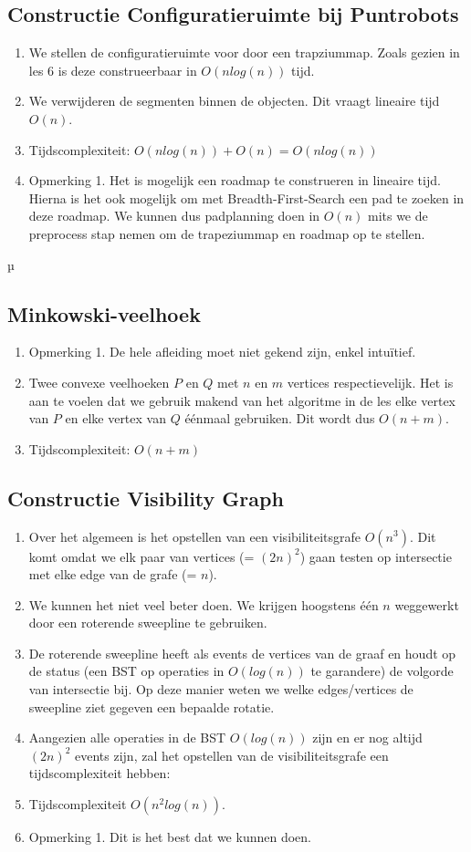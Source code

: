 \documentclass[12pt,a4paper]{article}
\begin{document}
		\subsection{Constructie Configuratieruimte bij Puntrobots}
			\begin{enumerate}
				\item We stellen de configuratieruimte voor door een trapziummap. Zoals gezien in les 6 is deze construeerbaar in $O(n log (n))$ tijd. 
				\item We verwijderen de segmenten binnen de objecten. Dit vraagt lineaire tijd $O(n)$.
				\item Tijdscomplexiteit: $O(n log (n)) + O(n) = O(n log (n))$
				\item Opmerking 1. Het is mogelijk een roadmap te construeren in lineaire tijd. Hierna is het ook mogelijk om met Breadth-First-Search een pad te zoeken in deze roadmap. We kunnen dus padplanning doen in $O(n)$ mits we de preprocess stap nemen om de trapeziummap en roadmap op te stellen.
			\end{enumerate}µ
		\subsection{Minkowski-veelhoek}
			\begin{enumerate}
				\item Opmerking 1. De hele afleiding moet niet gekend zijn, enkel intuïtief.
				\item Twee convexe veelhoeken $P$ en $Q$ met $n$ en $m$ vertices respectievelijk. Het is aan te voelen dat we gebruik makend van het algoritme in de les elke vertex van $P$ en elke vertex van $Q$ éénmaal gebruiken. Dit wordt dus $O(n + m)$.
				\item Tijdscomplexiteit: $O(n + m)$
			\end{enumerate}
		\subsection{Constructie Visibility Graph} 
			\begin{enumerate}
				\item Over het algemeen is het opstellen van een visibiliteitsgrafe $O(n^3)$. Dit komt omdat we elk paar van vertices (= $(2n)^2$) gaan testen op intersectie met elke edge van de grafe (= $n$). 
				\item We kunnen het niet veel beter doen. We krijgen hoogstens één $n$ weggewerkt door een roterende sweepline te gebruiken.
				\item De roterende sweepline heeft als events de vertices van de graaf en houdt op de status (een BST op operaties in $O(log (n))$ te garandere) de volgorde van intersectie bij. Op deze manier weten we welke edges/vertices de sweepline ziet gegeven een bepaalde rotatie.
				\item Aangezien alle operaties in de BST $O(log (n))$ zijn en er nog altijd $(2n)^2$ events zijn, zal het opstellen van de visibiliteitsgrafe een tijdscomplexiteit hebben:
				\item Tijdscomplexiteit $O(n^2 log (n))$. 
				\item Opmerking 1. Dit is het best dat we kunnen doen.
			\end{enumerate}
\end{document}
